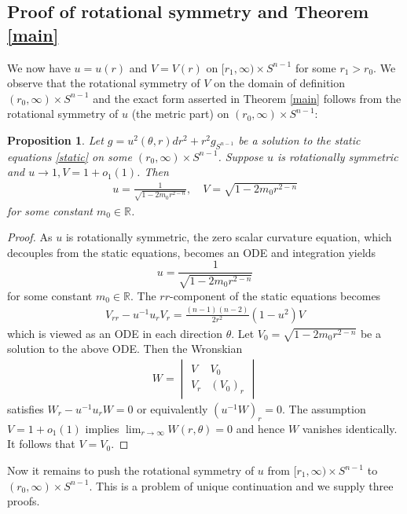 \documentclass[12pt,twoside]{article}
\theoremstyle{plain}
\newtheorem{prop}[theorem]{Proposition}
\theoremstyle{definition}
\theoremstyle{remark}
\newcommand{\rw}{\rightarrow}
\newcommand{\R}{\mathbb{R}}
\numberwithin{equation}{section}
\begin{document}
\subsection{Proof of rotational symmetry and Theorem \ref{main}}
We now have $u = u(r)$ and $V = V(r)$ on $[r_1,\infty) \times S^{n-1}$ for some $r_1 > r_0$. We observe that the rotational symmetry of $V$ on the domain of definition $(r_0,\infty) \times S^{n-1}$ and the exact form asserted in Theorem \ref{main} follows from the rotational symmetry of $u$ (the metric part) on $(r_0,\infty) \times S^{n-1}$: 
\begin{prop}\label{rotationally symmetric u,V}
Let $g = u^2(\theta,r)dr^2 + r^2 g_{S^{n-1}}$ be a solution to the static equations \eqref{static} on some $(r_0,\infty) \times S^{n-1}$. Suppose $u$ is rotationally symmetric and $u  \rw 1, V = 1 + o_1(1)$. Then
\begin{align*}
u = \frac{1}{\sqrt{1 - 2m_0 r^{2-n}}}, \quad V = \sqrt{1 - 2m_0 r^{2-n}}
\end{align*}
for some constant $m_0 \in \R$.
\end{prop}
\begin{proof}
As $u$ is rotationally symmetric, the zero scalar curvature equation, which decouples from the static equations, becomes an ODE and integration yields
\[ u = \frac{1}{\sqrt{1 - 2m_0 r^{2-n}}} \]
for some constant $m_0 \in \R$. The $rr$-component of the static equations becomes
\begin{align*}
V_{rr} - u^{-1} u_r V_r = \frac{(n-1)(n-2)}{2r^2} (1-u^2)V
\end{align*}
which is viewed as an ODE in each direction $\theta$. Let $V_0 = \sqrt{1 - 2m_0 r^{2-n}}$ be a solution to the above ODE. Then the Wronskian
\begin{align*}
W =\begin{vmatrix}
V & V_0 \\
V_r & (V_0)_r
\end{vmatrix}
\end{align*}
satisfies $W_r - u^{-1}u_r W =0$ or equivalently $(u^{-1}W)_r =0$. The assumption $V = 1 + o_1(1)$ implies $\lim_{r\rw\infty}W (r,\theta)=0$ and hence $W$ vanishes identically. It follows that $V = V_0$.
\end{proof}

Now it remains to push the rotational symmetry of $u$ from $[r_1,\infty) \times S^{n-1}$ to $(r_0,\infty) \times S^{n-1}$. This is a problem of unique continuation and we supply three proofs.
\end{document}
